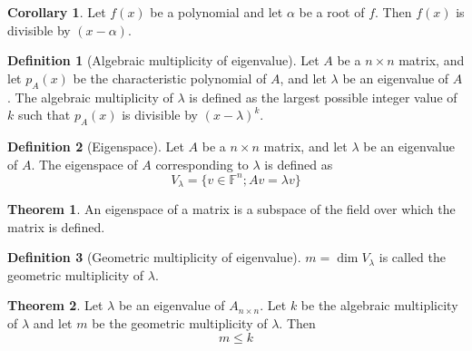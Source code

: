 \documentclass[fleqn, a4paper, 12pt]{article}
\theoremstyle{definition}
\newtheorem{definition}{Definition} %
\theoremstyle{theorem}
\newtheorem{theorem}{Theorem} %
\newtheorem{corollary}{Corollary}
\theoremstyle{remark}
\numberwithin{corollary}{theorem}
\numberwithin{equation}{theorem}
\begin{document}
\begin{corollary}
	Let $f(x)$ be a polynomial and let $\alpha$ be a root of $f$. Then $f(x)$ is divisible by $(x - \alpha)$.
\end{corollary}

\begin{definition}[Algebraic multiplicity of eigenvalue]\label{algebraic multiplicity}
	Let $A$ be a $n \times n$ matrix, and let $p_A (x)$ be the characteristic polynomial of $A$, and let $\lambda$ be an eigenvalue of $A$. The algebraic multiplicity of $\lambda$ is defined as the largest possible integer value of $k$ such that $p_A(x)$ is divisible by $(x - \lambda)^k$.
\end{definition}

\begin{definition}[Eigenspace]
	Let $A$ be a $n \times n$ matrix, and let $\lambda$ be an eigenvalue of $A$. The eigenspace of $A$ corresponding to $\lambda$ is defined as
	\begin{equation*}
		V_{\lambda} = \{v \in \mathbb{F}^n ; A v = \lambda v \}
	\end{equation*} 
\end{definition}

\begin{theorem}
	An eigenspace of a matrix is a subspace of the field over which the matrix is defined.
\end{theorem}

\begin{definition}[Geometric multiplicity of eigenvalue]
	$m = \dim V_{\lambda}$ is called the geometric multiplicity of $\lambda$.
\end{definition}

\begin{theorem}
	Let $\lambda$ be an eigenvalue of $A_{n \times n}$. Let $k$ be the algebraic multiplicity of $\lambda$ and let $m$ be the geometric multiplicity of $\lambda$. Then
	\begin{equation*}
		m \leq k
	\end{equation*}
\end{theorem}
\end{document}
